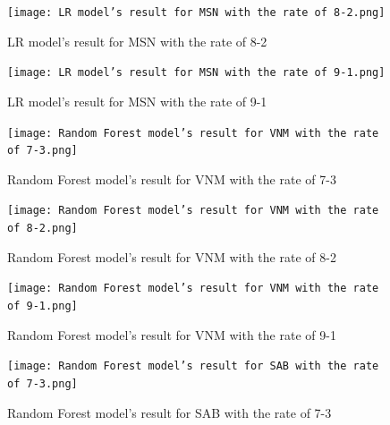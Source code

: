 \documentclass{ieeeojies}
\begin{document}
    \begin{figure}[H]
    \centering
    \begin{minipage}{0.23\textwidth}
    \centering
    \texttt{[image: LR model’s result for MSN with the rate of 8-2.png]}
    \caption{LR model’s result for MSN with the rate of 8-2}
    \end{minipage}
    \hfill
    \begin{minipage}{0.23\textwidth}
    \centering
    \texttt{[image: LR model’s result for MSN with the rate of 9-1.png]}
    \caption{LR model’s result for MSN with the rate of 9-1}
    \end{minipage}
     \end{figure}
  \begin{figure}[H]
    \centering
    \begin{minipage}{0.23\textwidth}
    \centering
    \texttt{[image: Random Forest model’s result for VNM with the rate of 7-3.png]}
    \caption{Random Forest model’s result for VNM with the rate of 7-3}
    \end{minipage}
    \hfill
    \begin{minipage}{0.23\textwidth}
    \centering
    \texttt{[image: Random Forest model’s result for VNM with the rate of 8-2.png]}
    \caption{Random Forest model’s result for VNM with the rate of 8-2}
    \end{minipage}

    \begin{minipage}{0.23\textwidth}
    \centering
    \texttt{[image: Random Forest model’s result for VNM with the rate of 9-1.png]}
    \caption{Random Forest model’s result for VNM with the rate of 9-1}
    \end{minipage}
    \hfill
    \begin{minipage}{0.23\textwidth}
    \centering
    \texttt{[image: Random Forest model’s result for SAB with the rate of 7-3.png]}
    \caption{Random Forest model’s result for SAB with the rate of 7-3}
    \end{minipage}
   \end{figure}
\end{document}
